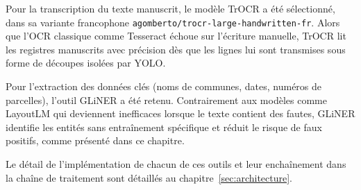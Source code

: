Pour la transcription du texte manuscrit, le modèle TrOCR a été sélectionné, dans sa variante francophone \texttt{agomberto/trocr-large-handwritten-fr}. Alors que l'OCR classique comme Tesseract échoue sur l'écriture manuelle, TrOCR lit les registres manuscrits avec précision dès que les lignes lui sont transmises sous forme de découpes isolées par YOLO.

Pour l'extraction des données clés (noms de communes, dates, numéros de parcelles), l'outil GLiNER a été retenu. Contrairement aux modèles comme LayoutLM qui deviennent inefficaces lorsque le texte contient des fautes, GLiNER identifie les entités sans entraînement spécifique et réduit le risque de faux positifs, comme présenté dans ce chapitre.

Le détail de l'implémentation de chacun de ces outils et leur enchaînement dans la chaîne de traitement sont détaillés au chapitre~\ref{sec:architecture}.




